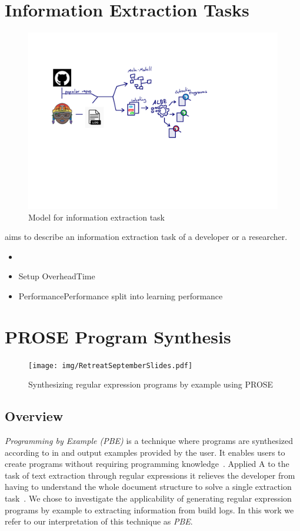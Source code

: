 \documentclass[\myrootdir/main.tex]{subfiles}
\begin{document}
\section{Information Extraction Tasks}
\begin{figure}[h]
	\centering
	\includegraphics[page=4, width=\textwidth, trim={0.5cm 0.5cm 0.5cm 0.5cm}, clip]{img/flow-of-research.pdf}
	\caption{Model for information extraction task}
	\label{fig:modelt-ie-task}
\end{figure}
aims to describe an information extraction task of a developer or a researcher.
\begin{itemize}
	\item {}
	\item{Setup Overhead}{Time}
	\item{Performance}{Performance} split into learning performance
\end{itemize}


\section{PROSE Program Synthesis}
\begin{figure}[h]
  \centering
\texttt{[image: img/RetreatSeptemberSlides.pdf]}
  \caption{Synthesizing regular expression programs by example using PROSE}
  \label{fig:prose-explanation}
\end{figure}
\subsection{Overview}
\emph{Programming by Example (PBE)} is a technique where programs are synthesized according to in and output examples provided by the user. It enables users to create programs without requiring programming knowledge~\cite{mayer2015user}. Applied A to the task of text extraction through regular expressions it relieves the developer from having to understand the whole document structure to solve a single extraction task~\cite{le2014flashextract:}.
We chose to investigate the applicability of generating regular expression programs by example to extracting information from build logs. In this work we refer to our interpretation of this technique as \emph{PBE}. 
\end{document}
